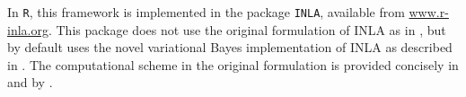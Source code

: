 In \texttt{R}, this framework is implemented in the package \texttt{INLA}, available from \url{www.r-inla.org}. This package does not use the original formulation of INLA as in \cite{Original-INLA}, but by default uses the novel variational Bayes implementation of INLA as described in \cite{vanniekerk2023lowrank}. The computational scheme in the original formulation is provided concisely in \citep{Prosjektoppgave} and by \cite{R-INLA}.




